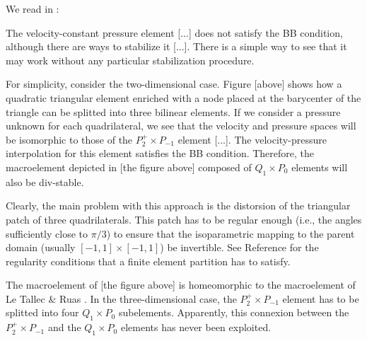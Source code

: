 We read in \textcite{rovira1992}:
\begin{displayquote}
{\color{MidnightBlue}
The velocity-constant pressure element [...] does not satisfy the BB condition, although there
are ways to stabilize it [...]. There is a simple way to see that it may work without any particular 
stabilization procedure.}

\begin{center}
\end{center}


{\color{MidnightBlue}
For simplicity, consider the two-dimensional case. Figure [above] shows how a quadratic
triangular element enriched with a node placed at the barycenter of the triangle can
be splitted into three bilinear elements. If we consider a pressure unknown for each
quadrilateral, we see that the velocity and pressure spaces will be isomorphic to those
of the $P_2^+ \times P_{-1}$ element [...]. The velocity-pressure interpolation for this
element satisfies the BB condition. Therefore, the macroelement depicted in [the figure above]
composed of $Q_1 \times P_0$ elements will also be div-stable.

Clearly, the main problem with this approach is the distorsion of the triangular
patch of three quadrilaterals. This patch has to be regular enough (i.e., the angles
sufficiently close to $\pi/3$) to ensure that the isoparametric mapping to the parent domain
(usually $[-1,1] \times [-1,1]$) be invertible. See Reference \cite{ciarlet2002finite} 
for the regularity conditions that a finite element partition has to satisfy.

The macroelement of [the figure above] is homeomorphic to the macroelement of Le Tallec
\& Ruas \cite{leru86}.
In the three-dimensional case, the $P_2^+ \times P_{-1}$ 
element has to be splitted into four $Q_1 \times P_0$ subelements. 
Apparently, this connexion between the $P_2^+ \times P_{-1}$ and the $Q_1 \times P_0$
elements has never been exploited.}

\end{displayquote}


